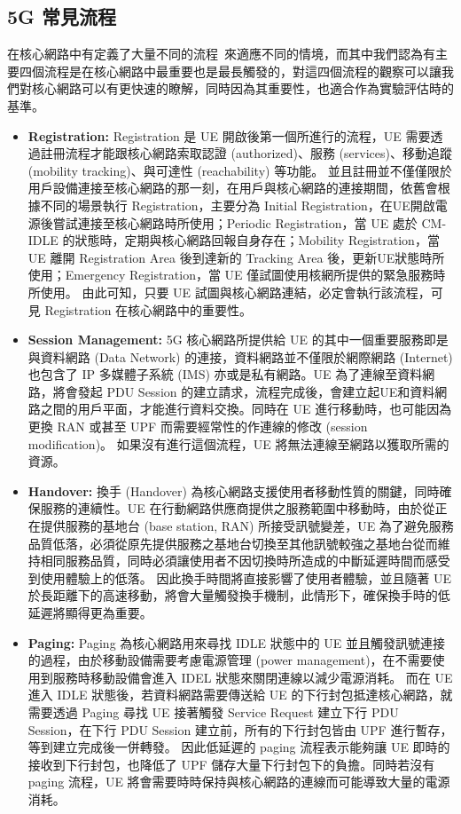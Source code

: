 \subsection{5G 常見流程}
\label{subsec:5g_procedure}

在核心網路中有定義了大量不同的流程~\cite{3gpp.23.502}來適應不同的情境，而其中我們認為有主要四個流程是在核心網路中最重要也是最長觸發的，對這四個流程的觀察可以讓我們對核心網路可以有更快速的瞭解，同時因為其重要性，也適合作為實驗評估時的基準。

\begin{itemize}
\item \textbf{Registration:}
    Registration 是 UE 開啟後第一個所進行的流程，UE 需要透過註冊流程才能跟核心網路索取認證 (authorized)、服務 (services)、移動追蹤 (mobility tracking)、與可達性 (reachability) 等功能。
    並且註冊並不僅僅限於用戶設備連接至核心網路的那一刻，在用戶與核心網路的連接期間，依舊會根據不同的場景執行 Registration，主要分為 Initial Registration，在UE開啟電源後嘗試連接至核心網路時所使用；Periodic Registration，當 UE 處於 CM-IDLE 的狀態時，定期與核心網路回報自身存在；Mobility Registration，當 UE 離開 Registration Area 後到達新的 Tracking Area 後，更新UE狀態時所使用；Emergency Registration，當 UE 僅試圖使用核網所提供的緊急服務時所使用。
    由此可知，只要 UE 試圖與核心網路連結，必定會執行該流程，可見 Registration 在核心網路中的重要性。

\item \textbf{Session Management:}
    5G 核心網路所提供給 UE 的其中一個重要服務即是與資料網路 (Data Network) 的連接，資料網路並不僅限於網際網路 (Internet) 也包含了 IP 多媒體子系統 (IMS) 亦或是私有網路。UE 為了連線至資料網路，將會發起 PDU Session 的建立請求，流程完成後，會建立起UE和資料網路之間的用戶平面，才能進行資料交換。同時在 UE 進行移動時，也可能因為更換 RAN 或甚至 UPF 而需要經常性的作連線的修改 (session modification)。
    如果沒有進行這個流程，UE 將無法連線至網路以獲取所需的資源。

\item \textbf{Handover:}
    換手 (Handover) 為核心網路支援使用者移動性質的關鍵，同時確保服務的連續性。UE 在行動網路供應商提供之服務範圍中移動時，由於從正在提供服務的基地台 (base station, RAN) 所接受訊號變差，UE 為了避免服務品質低落，必須從原先提供服務之基地台切換至其他訊號較強之基地台從而維持相同服務品質，同時必須讓使用者不因切換時所造成的中斷延遲時間而感受到使用體驗上的低落。
    因此換手時間將直接影響了使用者體驗，並且隨著 UE 於長距離下的高速移動，將會大量觸發換手機制，此情形下，確保換手時的低延遲將顯得更為重要。

\item \textbf{Paging:}
    Paging 為核心網路用來尋找 IDLE 狀態中的 UE 並且觸發訊號連接的過程，由於移動設備需要考慮電源管理 (power management)，在不需要使用到服務時移動設備會進入 IDEL 狀態來關閉連線以減少電源消耗。
    而在 UE 進入 IDLE 狀態後，若資料網路需要傳送給 UE 的下行封包抵達核心網路，就需要透過 Paging 尋找 UE 接著觸發 Service Request 建立下行 PDU Session，在下行 PDU Session 建立前，所有的下行封包皆由 UPF 進行暫存，等到建立完成後一併轉發。
    因此低延遲的 paging 流程表示能夠讓 UE 即時的接收到下行封包，也降低了 UPF 儲存大量下行封包下的負擔。同時若沒有 paging 流程，UE 將會需要時時保持與核心網路的連線而可能導致大量的電源消耗。
\end{itemize}

